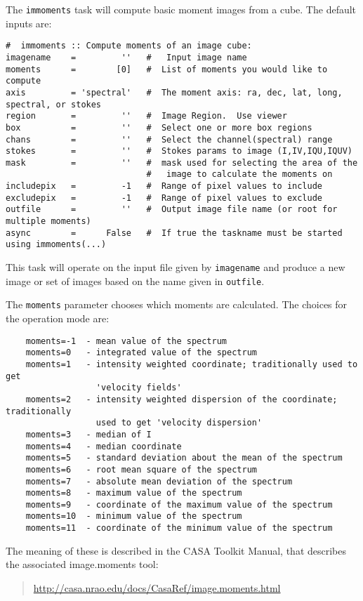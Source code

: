 The {\tt immoments} task will compute basic moment images from a cube.
The default inputs are:
\small
\begin{verbatim}
#  immoments :: Compute moments of an image cube:
imagename    =         ''   #   Input image name
moments      =        [0]   #  List of moments you would like to compute
axis         = 'spectral'   #  The moment axis: ra, dec, lat, long, spectral, or stokes
region       =         ''   #  Image Region.  Use viewer
box          =         ''   #  Select one or more box regions
chans        =         ''   #  Select the channel(spectral) range
stokes       =         ''   #  Stokes params to image (I,IV,IQU,IQUV)
mask         =         ''   #  mask used for selecting the area of the
                            #   image to calculate the moments on
includepix   =         -1   #  Range of pixel values to include
excludepix   =         -1   #  Range of pixel values to exclude
outfile      =         ''   #  Output image file name (or root for multiple moments)
async        =      False   #  If true the taskname must be started using immoments(...)
\end{verbatim}
\normalsize

This task will operate on the input file given by {\tt imagename} and
produce a new image or set of images based on the name given in
{\tt outfile}.

The {\tt moments} parameter chooses which moments are calculated.
The choices for the operation mode are:
\small
\begin{verbatim}
    moments=-1  - mean value of the spectrum
    moments=0   - integrated value of the spectrum
    moments=1   - intensity weighted coordinate; traditionally used to get 
                  'velocity fields'
    moments=2   - intensity weighted dispersion of the coordinate; traditionally
                  used to get 'velocity dispersion'
    moments=3   - median of I
    moments=4   - median coordinate
    moments=5   - standard deviation about the mean of the spectrum
    moments=6   - root mean square of the spectrum
    moments=7   - absolute mean deviation of the spectrum
    moments=8   - maximum value of the spectrum
    moments=9   - coordinate of the maximum value of the spectrum
    moments=10  - minimum value of the spectrum
    moments=11  - coordinate of the minimum value of the spectrum
\end{verbatim}
\normalsize
The meaning of these is described in the CASA Toolkit Manual, that
describes the associated image.moments tool:
\begin{quote}
   \url{http://casa.nrao.edu/docs/CasaRef/image.moments.html}
\end{quote}

